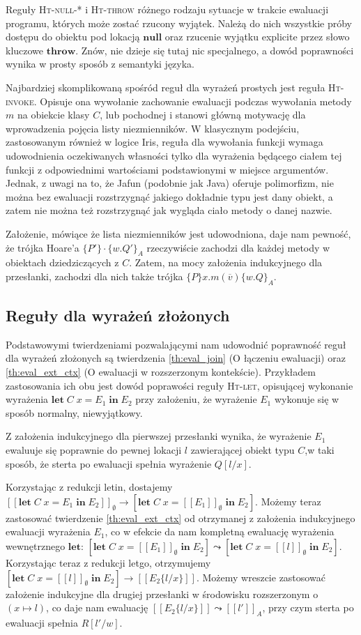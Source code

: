 \documentclass[]{pracamgr}
\newcommand \hoare [5] {\{#1\}#2\{#4.#5\}_#3}
\renewcommand \| {\hspace{0.75em} | \hspace{0.75em} }
\renewcommand \[ {[\![}
\renewcommand \] {]\!]}
\newcommand \eval [1] {\overset{#1}{\leadsto}}
\theoremstyle{definition}
\newcommand{\jlet}{\mathbf{let}\xspace}
\newcommand{\jin}{\mathbf{in}\xspace}
\newcommand{\jthrow}{\mathbf{throw}\xspace}
\newcommand{\jnull}{\mathbf{null}\xspace}
\newcommand{\letin}[4]{\jlet\; #1\; #2 = #3\; \jin\; #4\xspace}
\begin{document}
Reguły \textsc{Ht-null-*} i \textsc{Ht-throw} różnego rodzaju sytuacje w trakcie ewaluacji programu,
których może zostać rzucony wyjątek. Należą do nich wszystkie próby dostępu do obiektu pod lokacją
$\jnull$ oraz rzucenie wyjątku explicite przez słowo kluczowe $\jthrow$.
Znów, nie dzieje się tutaj nic specjalnego, a dowód poprawności wynika w prosty sposób z
semantyki języka.

Najbardziej skomplikowaną spośród reguł dla wyrażeń prostych jest reguła \textsc{Ht-invoke}.
Opisuje ona wywołanie zachowanie ewaluacji podczas wywołania metody $m$ na obiekcie klasy $C$,
lub pochodnej i stanowi główną motywację dla wprowadzenia pojęcia listy niezmienników.
W klasycznym podejściu, zastosowanym również w logice Iris, reguła dla wywołania funkcji
wymaga udowodnienia oczekiwanych własności tylko dla wyrażenia będącego ciałem tej funkcji z
odpowiednimi wartościami podstawionymi w miejsce argumentów.
Jednak, z uwagi na to, że Jafun (podobnie jak Java) oferuje polimorfizm, nie można bez ewaluacji
rozstrzygnąć jakiego dokładnie typu jest dany obiekt, a zatem nie można też rozstrzygnąć
jak wygląda ciało metody o danej nazwie.

Założenie, mówiące że lista niezmienników jest udowodniona, daje nam pewność, że
trójka Hoare'a $\hoare{P'}{\cdot}{A}{w}{Q'}$ rzeczywiście zachodzi dla każdej metody w obiektach
dziedziczących z $C$. Zatem, na mocy założenia indukcyjnego dla przesłanki, zachodzi dla nich
także trójka $\hoare{P}{x.m(\overline{v})}{A}{w}{Q}$.

\subsection{Reguły dla wyrażeń złożonych}
Podstawowymi twierdzeniami pozwalającymi nam udowodnić poprawność reguł dla wyrażeń złożonych są
twierdzenia \ref{th:eval_join} (O łączeniu ewaluacji) oraz
\ref{th:eval_ext_ctx} (O ewaluacji w rozszerzonym kontekście).
Przykładem zastosowania ich obu jest dowód poprawości reguły \textsc{Ht-let}, opisującej
wykonanie wyrażenia $\letin{C}{x}{E_1}{E_2}$ przy założeniu, że wyrażenie $E_1$ wykonuje się w sposób
normalny, niewyjątkowy.

Z założenia indukcyjnego dla pierwszej przesłanki wynika, że wyrażenie $E_1$ ewaluuje się poprawnie
do pewnej lokacji $l$ zawierającej obiekt typu $C$,w taki sposób, że sterta po ewaluacji
spełnia wyrażenie $Q[l/x]$.

Korzystając z redukcji letin, dostajemy 
$\[ \letin{C}{x}{E_1}{E_2}\]_\emptyset\rightarrow [\letin{C}{x}{\[ E_1\] _\emptyset}{E_2}]$.
Możemy teraz zastosować twierdzenie \ref{th:eval_ext_ctx} od otrzymanej z założenia indukcyjnego
ewaluacji wyrażenia $E_1$, co w efekcie da nam kompletną ewaluację wyrażenia wewnętrznego $\jlet$:
$[\letin{C}{x}{\[ E_1\] _\emptyset}{E_2}] \eval{} [\letin{C}{x}{\[ l \] _\emptyset}{E_2}]$.
Korzystając teraz z redukcji letgo, otrzymujemy
$[\letin{C}{x}{\[ l \] _\emptyset}{E_2}] \rightarrow \[ E_2\{l/x\} \]$.
Możemy wreszcie zastosować założenie indukcyjne dla drugiej przesłanki w środowisku rozszerzonym o
$(x \mapsto l)$, co daje nam ewaluację $\[ E_2\{l/x\} \] \eval{} \[ l' \]_A$, przy czym sterta po
ewaluacji spełnia $R[l'/w]$.
\end{document}
